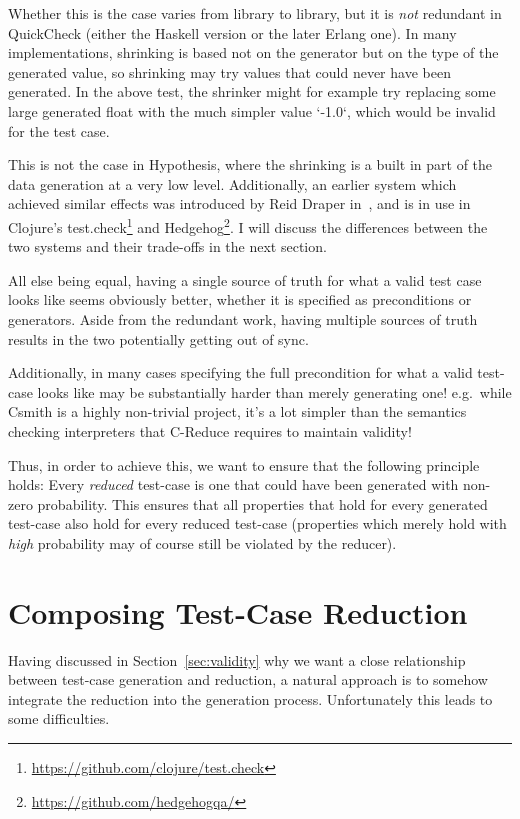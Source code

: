 Whether this is the case varies from library to library,
but it is \emph{not} redundant in QuickCheck (either the Haskell version or the later Erlang one).
In many implementations,
shrinking is based not on the generator but on the type of the generated value,
so shrinking may try values that could never have been generated.
In the above test,
the shrinker might for example try replacing some large generated float with the much simpler value `-1.0`,
which would be invalid for the test case.

This is not the case in Hypothesis,
where the shrinking is a built in part of the data generation at a very low level.
Additionally,
an earlier system which achieved similar effects was introduced by Reid Draper in~\cite{FreeShrinking},
and is in use in Clojure's test.check\footnote{\url{https://github.com/clojure/test.check}} and Hedgehog\footnote{\url{https://github.com/hedgehogqa/}}.
I will discuss the differences between the two systems and their trade-offs in the next section.

All else being equal,
having a single source of truth for what a valid test case looks like seems obviously better,
whether it is specified as preconditions or generators.
Aside from the redundant work,
having multiple sources of truth results in the two potentially getting out of sync.

Additionally,
in many cases specifying the full precondition for what a valid test-case looks like may be substantially harder than merely generating one!
e.g.\ while Csmith is a highly non-trivial project,
it's a lot simpler than the semantics checking interpreters that C-Reduce requires to maintain validity!

Thus,
in order to achieve this,
we want to ensure that the following principle holds:
Every \emph{reduced} test-case is one that could have been generated with non-zero probability.
This ensures that all properties that hold for every generated test-case also hold for every reduced test-case
(properties which merely hold with \emph{high} probability may of course still be violated by the reducer).

\section{Composing Test-Case Reduction}

Having discussed in Section~\ref{sec:validity} why we want a close relationship between test-case generation and reduction,
a natural approach is to somehow integrate the reduction into the generation process.
Unfortunately this leads to some difficulties.


